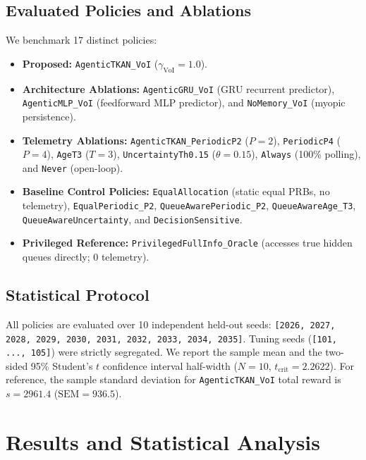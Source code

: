 \documentclass[conference]{IEEEtran}
\begin{document}
\subsection{Evaluated Policies and Ablations}
We benchmark 17 distinct policies:
\begin{itemize}
    \item \textbf{Proposed:} \texttt{AgenticTKAN\_VoI} ($\gamma_{\text{VoI}} = 1.0$).
    \item \textbf{Architecture Ablations:} \texttt{AgenticGRU\_VoI} (GRU recurrent predictor), \texttt{AgenticMLP\_VoI} (feedforward MLP predictor), and \texttt{NoMemory\_VoI} (myopic persistence).
    \item \textbf{Telemetry Ablations:} \texttt{AgenticTKAN\_PeriodicP2} ($P=2$), \texttt{PeriodicP4} ($P=4$), \texttt{AgeT3} ($T=3$), \texttt{UncertaintyTh0.15} ($\theta=0.15$), \texttt{Always} (100\% polling), and \texttt{Never} (open-loop).
    \item \textbf{Baseline Control Policies:} \texttt{EqualAllocation} (static equal PRBs, no telemetry), \texttt{EqualPeriodic\_P2}, \texttt{QueueAwarePeriodic\_P2}, \texttt{QueueAwareAge\_T3}, \texttt{QueueAwareUncertainty}, and \texttt{DecisionSensitive}.
    \item \textbf{Privileged Reference:} \texttt{PrivilegedFullInfo\_Oracle} (accesses true hidden queues directly; 0 telemetry).
\end{itemize}

\subsection{Statistical Protocol}
All policies are evaluated over 10 independent held-out seeds: \texttt{[2026, 2027, 2028, 2029, 2030, 2031, 2032, 2033, 2034, 2035]}. Tuning seeds (\texttt{[101, ..., 105]}) were strictly segregated. We report the sample mean and the two-sided 95\% Student's $t$ confidence interval half-width ($N=10$, $t_{\text{crit}} = 2.2622$). For reference, the sample standard deviation for \texttt{AgenticTKAN\_VoI} total reward is $s = 2961.4$ ($\text{SEM} = 936.5$).

\section{Results and Statistical Analysis}
\end{document}
